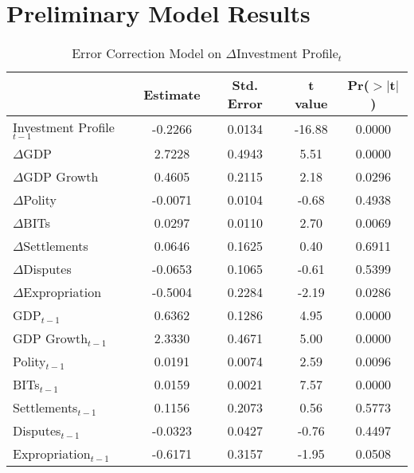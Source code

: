 \newpage

\section{Preliminary Model Results}
\begin{table}[ht]
\centering
\label{tab:invprofile}
\caption{Error Correction Model on $\Delta$Investment Profile$_{t}$}
\begin{tabular}{lcccc}
  \hline\hline
 & Estimate & Std. Error & t value & Pr($>$$|$t$|$) \\ 
  \hline
Investment Profile$_{t-1}$ & -0.2266 & 0.0134 & -16.88 & 0.0000 \\ 
\hline
  $\Delta$GDP & 2.7228 & 0.4943 & 5.51 & 0.0000 \\ 
  $\Delta$GDP Growth & 0.4605 & 0.2115 & 2.18 & 0.0296 \\ 
  $\Delta$Polity & -0.0071 & 0.0104 & -0.68 & 0.4938 \\ 
  $\Delta$BITs & 0.0297 & 0.0110 & 2.70 & 0.0069 \\ 
  $\Delta$Settlements & 0.0646 & 0.1625 & 0.40 & 0.6911 \\ 
  $\Delta$Disputes & -0.0653 & 0.1065 & -0.61 & 0.5399 \\ 
  $\Delta$Expropriation & -0.5004 & 0.2284 & -2.19 & 0.0286 \\ 
  \hline
  GDP$_{t-1}$ & 0.6362 & 0.1286 & 4.95 & 0.0000 \\ 
  GDP Growth$_{t-1}$ & 2.3330 & 0.4671 & 5.00 & 0.0000 \\ 
  Polity$_{t-1}$ & 0.0191 & 0.0074 & 2.59 & 0.0096 \\ 
  BITs$_{t-1}$ & 0.0159 & 0.0021 & 7.57 & 0.0000 \\ 
  Settlements$_{t-1}$ & 0.1156 & 0.2073 & 0.56 & 0.5773 \\ 
  Disputes$_{t-1}$ & -0.0323 & 0.0427 & -0.76 & 0.4497 \\ 
  Expropriation$_{t-1}$ & -0.6171 & 0.3157 & -1.95 & 0.0508 \\ 
   \hline\hline
\end{tabular}
\end{table}


